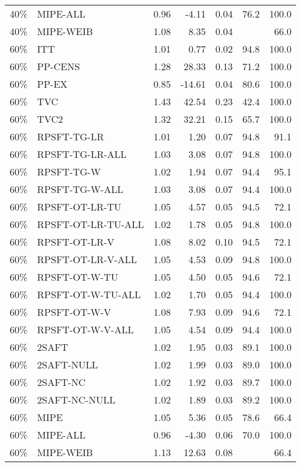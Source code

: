\begin{table}[ht]
{\begin{tabular}{llrrrrr}
  40\% & MIPE-ALL & 0.96 & -4.11 & 0.04 & 76.2 & 100.0 \\ 
  40\% & MIPE-WEIB & 1.08 & 8.35 & 0.04 &  & 66.0 \\ 
   \hline
60\% & ITT & 1.01 & 0.77 & 0.02 & 94.8 & 100.0 \\ 
  60\% & PP-CENS & 1.28 & 28.33 & 0.13 & 71.2 & 100.0 \\ 
  60\% & PP-EX & 0.85 & -14.61 & 0.04 & 80.6 & 100.0 \\ 
  60\% & TVC & 1.43 & 42.54 & 0.23 & 42.4 & 100.0 \\ 
  60\% & TVC2 & 1.32 & 32.21 & 0.15 & 65.7 & 100.0 \\ 
   \hline
60\% & RPSFT-TG-LR & 1.01 & 1.20 & 0.07 & 94.8 & 91.1 \\ 
  60\% & RPSFT-TG-LR-ALL & 1.03 & 3.08 & 0.07 & 94.8 & 100.0 \\ 
  60\% & RPSFT-TG-W & 1.02 & 1.94 & 0.07 & 94.4 & 95.1 \\ 
  60\% & RPSFT-TG-W-ALL & 1.03 & 3.08 & 0.07 & 94.4 & 100.0 \\ 
  60\% & RPSFT-OT-LR-TU & 1.05 & 4.57 & 0.05 & 94.5 & 72.1 \\ 
  60\% & RPSFT-OT-LR-TU-ALL & 1.02 & 1.78 & 0.05 & 94.8 & 100.0 \\ 
  60\% & RPSFT-OT-LR-V & 1.08 & 8.02 & 0.10 & 94.5 & 72.1 \\ 
  60\% & RPSFT-OT-LR-V-ALL & 1.05 & 4.53 & 0.09 & 94.8 & 100.0 \\ 
   \hline
60\% & RPSFT-OT-W-TU & 1.05 & 4.50 & 0.05 & 94.6 & 72.1 \\ 
  60\% & RPSFT-OT-W-TU-ALL & 1.02 & 1.70 & 0.05 & 94.4 & 100.0 \\ 
  60\% & RPSFT-OT-W-V & 1.08 & 7.93 & 0.09 & 94.6 & 72.1 \\ 
  60\% & RPSFT-OT-W-V-ALL & 1.05 & 4.54 & 0.09 & 94.4 & 100.0 \\ 
   \hline
60\% & 2SAFT & 1.02 & 1.95 & 0.03 & 89.1 & 100.0 \\ 
  60\% & 2SAFT-NULL & 1.02 & 1.99 & 0.03 & 89.0 & 100.0 \\ 
  60\% & 2SAFT-NC & 1.02 & 1.92 & 0.03 & 89.7 & 100.0 \\ 
  60\% & 2SAFT-NC-NULL & 1.02 & 1.89 & 0.03 & 89.2 & 100.0 \\ 
  60\% & MIPE & 1.05 & 5.36 & 0.05 & 78.6 & 66.4 \\ 
  60\% & MIPE-ALL & 0.96 & -4.30 & 0.06 & 70.0 & 100.0 \\ 
  60\% & MIPE-WEIB & 1.13 & 12.63 & 0.08 &  & 66.4 \\ 
   \hline
\end{tabular}
}
\end{table}
